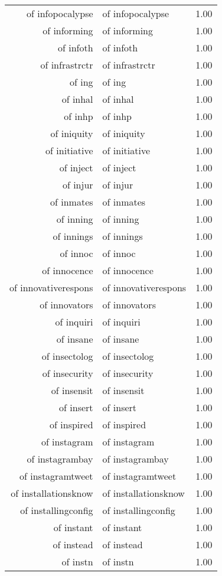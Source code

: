 \begin{table}[ht]
\begin{tabular}{rlr}
  of infopocalypse & of infopocalypse & 1.00 \\ 
  of informing & of informing & 1.00 \\ 
  of infoth & of infoth & 1.00 \\ 
  of infrastrctr & of infrastrctr & 1.00 \\ 
  of ing & of ing & 1.00 \\ 
  of inhal & of inhal & 1.00 \\ 
  of inhp & of inhp & 1.00 \\ 
  of iniquity & of iniquity & 1.00 \\ 
  of initiative & of initiative & 1.00 \\ 
  of inject & of inject & 1.00 \\ 
  of injur & of injur & 1.00 \\ 
  of inmates & of inmates & 1.00 \\ 
  of inning & of inning & 1.00 \\ 
  of innings & of innings & 1.00 \\ 
  of innoc & of innoc & 1.00 \\ 
  of innocence & of innocence & 1.00 \\ 
  of innovativerespons & of innovativerespons & 1.00 \\ 
  of innovators & of innovators & 1.00 \\ 
  of inquiri & of inquiri & 1.00 \\ 
  of insane & of insane & 1.00 \\ 
  of insectolog & of insectolog & 1.00 \\ 
  of insecurity & of insecurity & 1.00 \\ 
  of insensit & of insensit & 1.00 \\ 
  of insert & of insert & 1.00 \\ 
  of inspired & of inspired & 1.00 \\ 
  of instagram & of instagram & 1.00 \\ 
  of instagrambay & of instagrambay & 1.00 \\ 
  of instagramtweet & of instagramtweet & 1.00 \\ 
  of installationsknow & of installationsknow & 1.00 \\ 
  of installingconfig & of installingconfig & 1.00 \\ 
  of instant & of instant & 1.00 \\ 
  of instead & of instead & 1.00 \\ 
  of instn & of instn & 1.00 \\ 

\end{tabular}
\end{table}
